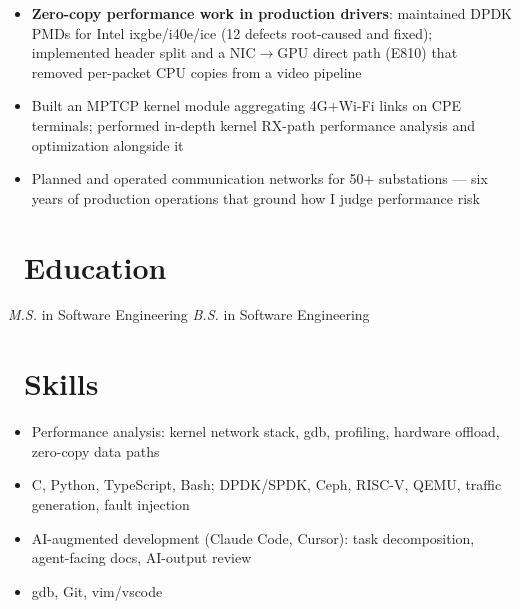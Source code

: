 \documentclass{resume}
\begin{document}
\begin{onehalfspacing}
\begin{itemize}
	\item \textbf{Zero-copy performance work in production drivers}: maintained DPDK PMDs for Intel ixgbe/i40e/ice (12 defects root-caused and fixed); implemented header split and a NIC$\to$GPU direct path (E810) that removed per-packet CPU copies from a video pipeline
\end{itemize}
\end{onehalfspacing}

\begin{onehalfspacing}
\begin{itemize}
	\item Built an MPTCP kernel module aggregating 4G+Wi-Fi links on CPE terminals; performed in-depth kernel RX-path performance analysis and optimization alongside it
\end{itemize}
\end{onehalfspacing}

\begin{onehalfspacing}
\begin{itemize}
	\item Planned and operated communication networks for 50+ substations --- six years of production operations that ground how I judge performance risk
\end{itemize}
\end{onehalfspacing}

\section{\faGraduationCap\ Education}
\textit{M.S.} in Software Engineering
\textit{B.S.} in Software Engineering

\section{\faWrench\ Skills}
\begin{itemize}[parsep=0.5ex]
  \item Performance analysis: kernel network stack, gdb, profiling, hardware offload, zero-copy data paths
  \item C, Python, TypeScript, Bash; DPDK/SPDK, Ceph, RISC-V, QEMU, traffic generation, fault injection
  \item AI-augmented development (Claude Code, Cursor): task decomposition, agent-facing docs, AI-output review
  \item gdb, Git, vim/vscode
\end{itemize}
\end{document}
